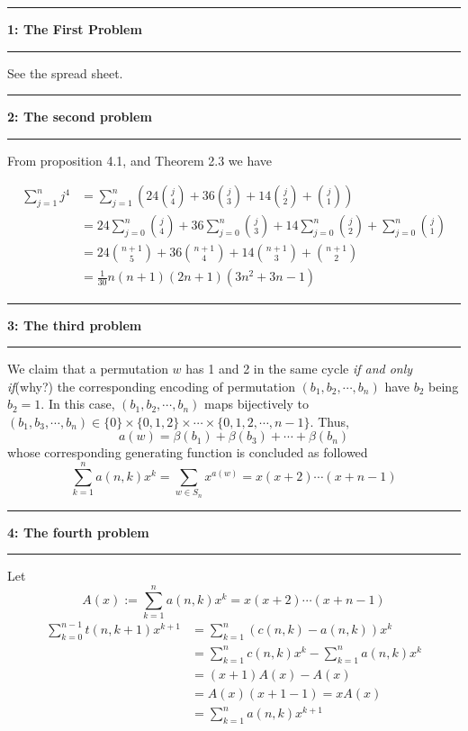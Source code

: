 \documentclass[11pt]{article}
\newcommand\question[2]{\vspace{.25in}\hrule\textbf{#1: #2}\vspace{.5em}\hrule\vspace{.10in}}
\newcommand{\sumn}{\sum_{k=1}^{n}}
\begin{document}
\raggedright
\newcommand\NAME{Carl Kingsford}  %
\newcommand\ANDREWID{ckingsf}     %
\newcommand\HWNUM{1}              %


\question{1}{The First Problem}
See the spread sheet.

\question{2}{The second problem}
From proposition 4.1, and Theorem 2.3 we have

\begin{align*}
    \sum_{j=1}^{n} j^4 &= \sum_{j=1}^{n} \left(24\binom{j}{4} + 36\binom{j}{3} + 14\binom{j}{2} + \binom{j}{1}\right) \\
                       &= 24\sum_{j=0}^{n}\binom{j}{4} + 36\sum_{j=0}^{n}\binom{j}{3} + 14\sum_{j=0}^{n}\binom{j}{2} + \sum_{j=0}^{n}\binom{j}{1} \\ 
                       &= 24\binom{n + 1}{5} + 36\binom{n + 1}{4} + 14\binom{n + 1}{3} + \binom{n + 1}{2} \\
                       &= \frac{1}{30}n(n+1)(2n+1)(3n^2+3n-1)
\end{align*}

\question{3}{The third problem}
We claim that a permutation $w$ has 1 and 2 in the same cycle \textit{if and only if}(why?) the corresponding encoding of permutation $(b_1, b_2, \cdots, b_n)$ have $b_2$ being $b_2 = 1$.
In this case, $(b_1, b_2, \cdots, b_n)$ maps bijectively to $(b_1, b_3, \cdots, b_n)\in \{0\}\times \{0,1,2\}\times\cdots\times\{0,1,2,\cdots,n-1\}$.
Thus, 
\[a(w) = \beta(b_1) + \beta(b_3) + \cdots + \beta(b_n)\]
whose corresponding generating function is concluded as followed
\[\sum_{k=1}^{n}a(n,k)x^{k} = \sum_{w\in S_n}x^{a(w)} = x(x+2)\cdots(x+n-1)\]

\pagebreak
\question{4}{The fourth problem}

Let \[A(x) := \sum_{k=1}^{n} a(n,k)x^{k} = x(x+2)\cdots(x+n-1)\]
\begin{align*}
    \sum_{k=0}^{n-1} t(n,k+1)x^{k+1} &= \sumn (c(n, k)-a(n,k))x^k \\
                      &= \sumn c(n,k)x^k - \sumn a(n,k)x^k \\ 
                      &= (x+1)A(x) - A(x) \\ 
                      &= A(x)(x+1-1) = xA(x) \\ 
                      &= \sumn a(n, k)x^{k+1}
\end{align*}
\end{document}
